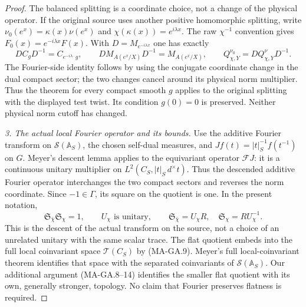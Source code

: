 \begin{proof}
The balanced splitting is a coordinate choice, not a change
of the physical operator.  If the original source uses
another positive homomorphic splitting, write
$\nu_0(e^x)=\kappa(x)\nu(e^x)$ and
$\chi(\kappa(x))=e^{i\lambda x}$.  The raw $\chi^{-1}$
convention gives $F_0(x)=e^{-i\lambda x}F(x)$.
With $D=M_{e^{-i\lambda x}}$ one has exactly
\[
 D C_gD^{-1}=C_{e^{-i\lambda\cdot}g},\qquad
 D M_{A(e^x/X)}D^{-1}=M_{A(e^x/X)},\qquad
 Q^{\nu_0}_{\chi,Y}=D Q^\nu_{\chi,Y}D^{-1}.
 \tag{MA-GA.15a}
\]
The Fourier-side identity follows by using the conjugate
coordinate change in the dual compact sector; the two
changes cancel around its physical norm multiplier.
Thus the theorem for every compact smooth $g$ applies
to the original splitting with the displayed test twist.
Its condition $g(0)=0$ is preserved.  Neither physical
norm cutoff has changed.

\emph{3. The actual local Fourier operator and its bounds.}
Use the additive Fourier transform on $\mathcal S(\mathbb A_S)$,
the chosen self-dual measures, and
$Jf(t)=|t|_S^{-1}f(t^{-1})$ on $G$.
Meyer's descent lemma applies to the equivariant operator
$\mathcal F J$: it is a continuous unitary multiplier on
$L^2(C_S,|t|_S\,d^\times t)$.  Thus the descended additive
Fourier operator interchanges the two compact sectors and
reverses the norm coordinate.  Since $-1\in\Gamma$, its
square on the quotient is one.  In the present notation,
\[
 \mathfrak S_{\bar\chi}\mathfrak S_\chi=1,
 \qquad U_\chi\text{ is unitary},\qquad
 \mathfrak S_{\bar\chi}=U_\chi R,
 \quad\mathfrak S_\chi=R U_\chi^{-1}.
 \tag{MA-GA.16}
\]
This is the descent of the actual transform on the source,
not a choice of an unrelated unitary with the same scalar
trace.  The flat quotient embeds into the full local
coinvariant space $\mathcal T(C_S)$ by (MA-GA.9).
Meyer's full local-coinvariant theorem identifies that space
with the separated coinvariants of $\mathcal S(\mathbb A_S)$.
Our additional argument (MA-GA.8--14) identifies the smaller
flat quotient with its own, generally stronger, topology.
No claim that Fourier preserves flatness is required.


\end{proof}
